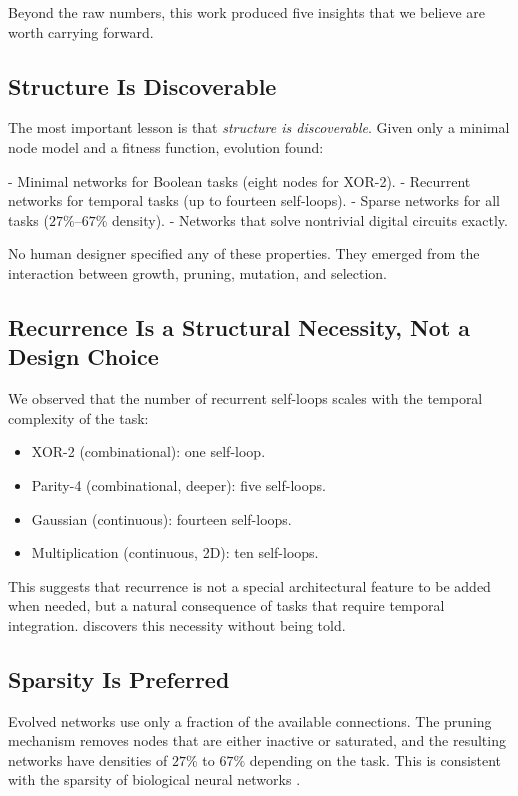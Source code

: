 Beyond the raw numbers, this work produced five insights that we
believe are worth carrying forward.

\subsection{Structure Is Discoverable}

The most important lesson is that \emph{structure is discoverable}.
Given only a minimal node model and a fitness function, evolution
found:

- Minimal networks for Boolean tasks (eight nodes for XOR-2).
- Recurrent networks for temporal tasks (up to fourteen self-loops).
- Sparse networks for all tasks ($27\%$--$67\%$ density).
- Networks that solve nontrivial digital circuits exactly.

No human designer specified any of these properties. They emerged from
the interaction between growth, pruning, mutation, and selection.

\subsection{Recurrence Is a Structural Necessity, Not a Design Choice}

We observed that the number of recurrent self-loops scales with the
temporal complexity of the task:

\begin{itemize}
  \item XOR-2 (combinational): one self-loop.
  \item Parity-4 (combinational, deeper): five self-loops.
  \item Gaussian (continuous): fourteen self-loops.
  \item Multiplication (continuous, 2D): ten self-loops.
\end{itemize}

This suggests that recurrence is not a special architectural feature to
be added when needed, but a natural consequence of tasks that require
temporal integration. \modnet{} discovers this necessity without being
told.

\subsection{Sparsity Is Preferred}

Evolved networks use only a fraction of the available connections. The
pruning mechanism removes nodes that are either inactive or saturated,
and the resulting networks have densities of $27\%$ to $67\%$
depending on the task. This is consistent with the sparsity of
biological neural networks \citep{chklovskii2004wiring, cherniak1994component}.

